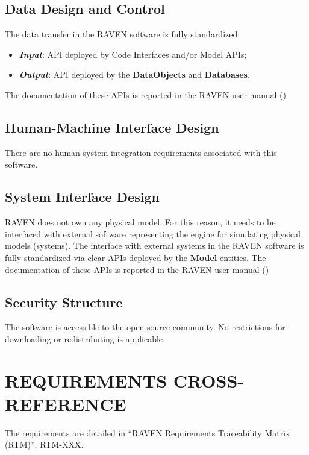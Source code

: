 \subsection{Data Design and Control}
The data transfer in the RAVEN software is fully standardized:
\begin{itemize}
  \item  \textbf{\textit{Input}}: API deployed by Code Interfaces and/or Model APIs;
  \item \textbf{\textit{Output}}: API deployed by the \textbf{DataObjects}  and \textbf{Databases}.
\end{itemize}
The documentation of these APIs is reported in the RAVEN user manual (\cite{RAVENuserManual})

\subsection{Human-Machine Interface Design} 
 There are no human system integration requirements associated with this software.
 \subsection{System Interface Design} 
RAVEN does not own any physical model. For this reason, it needs to be interfaced with external
software representing the engine for simulating physical models (systems). 
The interface with external systems in the RAVEN software is fully standardized via clear APIs deployed by
 the \textbf{Model}  entities.
The documentation of these APIs is reported in the RAVEN user manual (\cite{RAVENuserManual})

 \subsection{Security Structure} 
The software is accessible to the open-source community. No restrictions for downloading or redistributing is applicable.

 \section{REQUIREMENTS CROSS-REFERENCE} 
The requirements are detailed in ``RAVEN Requirements Traceability Matrix (RTM)'', RTM-XXX.